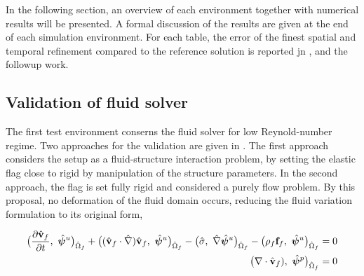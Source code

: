  In the following section, an overview of each environment together with numerical results will be presented. A formal discussion of the results are given at the end of each simulation environment. For each table, the error of the finest spatial and temporal refinement compared to the reference solution is reported jn \cite{Hron2006}, and the followup work.

\subsection{Validation of fluid solver}
The first test environment conserns the fluid solver for low Reynold-number regime. Two approaches for the validation are given in \cite{Hron2006}. The first approach considers the setup as a fluid-structure interaction problem, by setting the elastic flag close to rigid  by manipulation of the structure parameters. In the second approach, the flag is set fully rigid and considered a purely flow problem.  By this proposal, no deformation of the fluid domain occurs, reducing the fluid variation formulation to its original form,


\begin{align*}
 \big( \frac{\partial \hat{\mathbf{v}}_f}{\partial t}, \ \hat{\bm{\psi}}^u \big)_{\hat{\Omega}_f} +
\big((\hat{\mathbf{v}}_f \cdot \hat{\nabla}) \hat{\mathbf{v}}_f, \ {\hat{\bm{\psi}}^u} \big)_{\hat{\Omega}_f}
- \big(\hat{\sigma}, \ {\hat{\nabla}\hat{\bm{\psi}}^u} \big)_{\hat{\Omega}_f} -
\big(\rho_f  \mathbf{f}_f, \ {{\hat{\bm{\psi}}^u}} \big)_{\hat{\Omega}_f} = 0 \\
\big(\nabla \cdot \hat{\mathbf{v}}_f), \ {\hat{\bm{\psi}}^p} \big)_{\hat{\Omega}_f} = 0 
\end{align*} 

